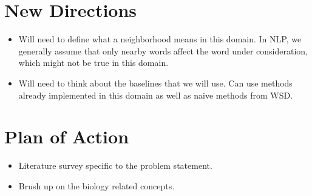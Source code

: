\documentclass{article}[11pt]
\begin{document}
\section{New Directions}
\begin{itemize}
\item Will need to define what a neighborhood means in this domain. In NLP, we generally assume that only nearby words affect the word under consideration, which might not be true in this domain.
\item Will need to think about the baselines that we will use. Can use methods already implemented in this domain as well as naive methods from WSD. %
\end{itemize}

\section{Plan of Action}
\begin{itemize}
\item Literature survey specific to the problem statement.
\item Brush up on the biology related concepts.
\end{itemize}
\end{document}
